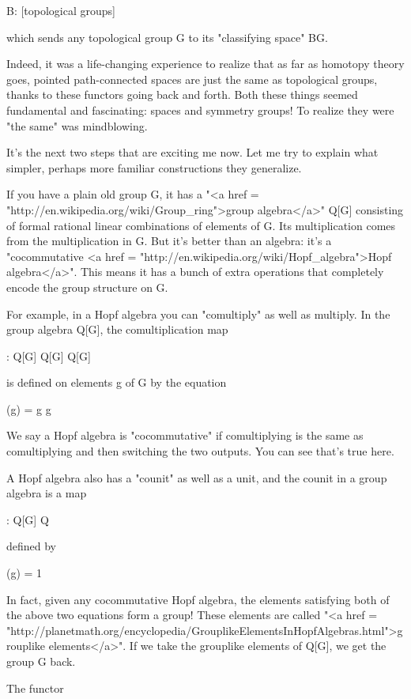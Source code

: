 B: [topological groups] 

which sends any topological group G to its "classifying space" BG.

Indeed, it was a life-changing experience to realize that as far as
homotopy theory goes, pointed path-connected spaces are just the same
as topological groups, thanks to these functors going back and forth.
Both these things seemed fundamental and fascinating: spaces and
symmetry groups!  To realize they were "the same" was mindblowing.

It's the next two steps that are exciting me now.  Let me try to
explain what simpler, perhaps more familiar constructions they
generalize.

If you have a plain old group G, it has a "<a href =
"http://en.wikipedia.org/wiki/Group_ring">group algebra</a>" Q[G]
consisting of formal rational linear combinations of elements of G.
Its multiplication comes from the multiplication in G.  But it's
better than an algebra: it's a "cocommutative <a href =
"http://en.wikipedia.org/wiki/Hopf_algebra">Hopf algebra</a>".
This means it has a bunch of extra operations that completely encode
the group structure on G.

For example, in a Hopf algebra you can "comultiply" as well
as multiply.  In the group algebra Q[G], the comultiplication map

\Delta : Q[G] \to  Q[G] \otimes  Q[G]

is defined on elements g of G by the equation

\Delta (g) = g \otimes  g

We say a Hopf algebra is "cocommutative" if comultiplying 
is the same as comultiplying and then switching the two outputs.
You can see that's true here.  

A Hopf algebra also has a "counit" as well as a unit, 
and the counit in a group algebra is a map

\epsilon  : Q[G] \to  Q 

defined by

\epsilon (g) = 1

In fact, given any cocommutative Hopf algebra, the elements satisfying
both of the above two equations form a group!  These elements are
called "<a href =
"http://planetmath.org/encyclopedia/GrouplikeElementsInHopfAlgebras.html">grouplike
elements</a>".  If we take the grouplike elements of Q[G], we get the
group G back.

The functor

